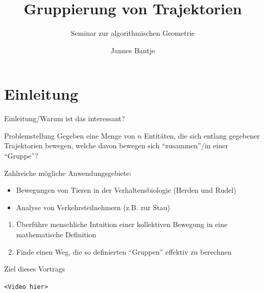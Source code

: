 \documentclass[
wide,
10pt,
xcolor={x11names,svgnames},
hyperref={pdfauthor={Jannes Bantje},colorlinks,urlcolor=maincolor,hidelinks=false,linkcolor=maincolor},
pantone312, 	%
euler-digits,
]{beamer}
\theoremstyle{definition}
\begin{document}
\makeatletter
\author{Jannes Bantje} \let\Author\@author
\title{Gruppierung von Trajektorien}
\subtitle{Seminar zur algorithmischen Geometrie}
\makeatother


\begin{frame}[plain]
  \maketitle
\end{frame}

\section{Einleitung}
\begin{frame}{Einleitung/Warum ist das interessant?}
    \begin{block}{Problemstellung}
        Gegeben eine Menge von $n$ Entitäten, die sich entlang gegebener Trajektorien bewegen, welche davon bewegen sich \enquote{zusammen}/in einer \enquote{Gruppe}?
    \end{block}\pause
    Zahlreiche mögliche Anwendungsgebiete:\pause
    \begin{itemize}[<+->]
        \item Bewegungen von Tieren in der Verhaltensbiologie (Herden und Rudel)
        \item Analyse von Verkehrsteilnehmern (z.B. zur Stau)
    \end{itemize}
    \begin{enumerate}
        \item<6-> Überführe menschliche Intuition einer kollektiven Bewegung in eine mathematische Definition
        \item<7-> Finde einen Weg, die so definierten \enquote{Gruppen} effektiv zu berechnen
    \end{enumerate}
\end{frame}

\begin{frame}{Ziel dieses Vortrags}
    \begin{center}
        \texttt{<Video hier>}
    \end{center}
\end{frame}
\end{document}
